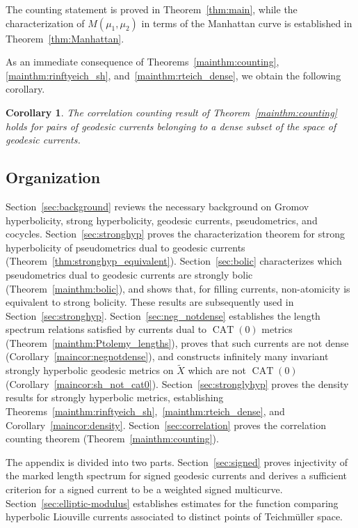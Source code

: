 \documentclass[12pt]{amsart}
\numberwithin{equation}{section}
\numberwithin{figure}{section}
\newtheorem{maincor}[mainthm]{Corollary}
\theoremstyle{definition}
\theoremstyle{plain}
\DeclareMathOperator{\CAT}{CAT}
\newcommand*{\wt}[1]{\widetilde{#1}}
\begin{document}
The counting statement is proved in Theorem~\ref{thm:main}, while the characterization of $M(\mu_1,\mu_2)$ in terms of the Manhattan curve is established in Theorem~\ref{thm:Manhattan}.

As an immediate consequence of Theorems~\ref{mainthm:counting},
\ref{mainthm:rinftyeich_sh}, and~\ref{mainthm:rteich_dense}, we obtain the following corollary.

\begin{maincor}
The correlation counting result of Theorem~\ref{mainthm:counting}
holds for pairs of geodesic currents belonging to a dense subset of the space of geodesic currents.
\end{maincor}

\subsection{Organization}

Section~\ref{sec:background} reviews the necessary background on Gromov hyperbolicity, strong hyperbolicity, geodesic currents, pseudometrics, and cocycles. Section~\ref{sec:stronghyp} proves the characterization theorem for strong hyperbolicity of pseudometrics dual to geodesic currents (Theorem~\ref{thm:stronghyp_equivalent}). Section~\ref{sec:bolic} characterizes which pseudometrics dual to geodesic currents are strongly bolic (Theorem~\ref{mainthm:bolic}), and shows that, for filling currents, non-atomicity is equivalent to strong bolicity. These results are subsequently used in Section~\ref{sec:stronghyp}. Section~\ref{sec:neg_notdense} establishes the length spectrum relations satisfied by currents dual to $\CAT(0)$ metrics (Theorem~\ref{mainthm:Ptolemy_lengths}), proves that such currents are not dense (Corollary~\ref{maincor:negnotdense}), and constructs infinitely many invariant strongly hyperbolic geodesic metrics on $\wt{X}$ which are not $\CAT(0)$ (Corollary~\ref{maincor:sh_not_cat0}). Section~\ref{sec:stronglyhyp} proves the density results for strongly hyperbolic metrics, establishing Theorems~\ref{mainthm:rinftyeich_sh},~\ref{mainthm:rteich_dense}, and Corollary~\ref{maincor:density}. Section~\ref{sec:correlation} proves the correlation counting theorem (Theorem~\ref{mainthm:counting}). 

The appendix is divided into two parts. Section~\ref{sec:signed} proves injectivity of the marked length spectrum for signed geodesic currents and derives a sufficient criterion for a signed current to be a weighted signed multicurve. Section~\ref{sec:elliptic-modulus} establishes estimates for the function comparing hyperbolic Liouville currents associated to distinct points of Teichm\"uller space.
\end{document}
